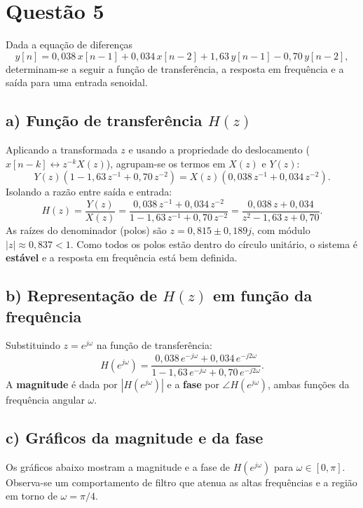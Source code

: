 \documentclass[12pt]{article}
\begin{document}
\section*{Questão 5}

Dada a equação de diferenças
\[
y[n] = 0{,}038\,x[n-1] + 0{,}034\,x[n-2] + 1{,}63\,y[n-1] - 0{,}70\,y[n-2],
\]
determinam-se a seguir a função de transferência, a resposta em frequência e a
saída para uma entrada senoidal.

\subsection*{a) Função de transferência $H(z)$}

Aplicando a transformada $z$ e usando a propriedade do deslocamento
($x[n-k]\leftrightarrow z^{-k}X(z)$), agrupam-se os termos em $X(z)$ e $Y(z)$:
\[
Y(z)\left(1 - 1{,}63\,z^{-1} + 0{,}70\,z^{-2}\right)
= X(z)\left(0{,}038\,z^{-1} + 0{,}034\,z^{-2}\right).
\]
Isolando a razão entre saída e entrada:
\[
\boxed{
H(z) = \frac{Y(z)}{X(z)}
= \frac{0{,}038\,z^{-1} + 0{,}034\,z^{-2}}{1 - 1{,}63\,z^{-1} + 0{,}70\,z^{-2}}
= \frac{0{,}038\,z + 0{,}034}{z^{2} - 1{,}63\,z + 0{,}70}.
}
\]
As raízes do denominador (polos) são $z = 0{,}815 \pm 0{,}189j$, com módulo
$|z| \approx 0{,}837 < 1$. Como todos os polos estão dentro do círculo unitário,
o sistema é \textbf{estável} e a resposta em frequência está bem definida.

\subsection*{b) Representação de $H(z)$ em função da frequência}

Substituindo $z = e^{j\omega}$ na função de transferência:
\[
H(e^{j\omega}) =
\frac{0{,}038\,e^{-j\omega} + 0{,}034\,e^{-j2\omega}}
     {1 - 1{,}63\,e^{-j\omega} + 0{,}70\,e^{-j2\omega}}.
\]
A \textbf{magnitude} é dada por $\left|H(e^{j\omega})\right|$ e a \textbf{fase}
por $\angle H(e^{j\omega})$, ambas funções da frequência angular $\omega$.

\subsection*{c) Gráficos da magnitude e da fase}

Os gráficos abaixo mostram a magnitude e a fase de $H(e^{j\omega})$ para
$\omega \in [0, \pi]$. Observa-se um comportamento de filtro que atenua as altas
frequências e a região em torno de $\omega = \pi/4$.
\end{document}
